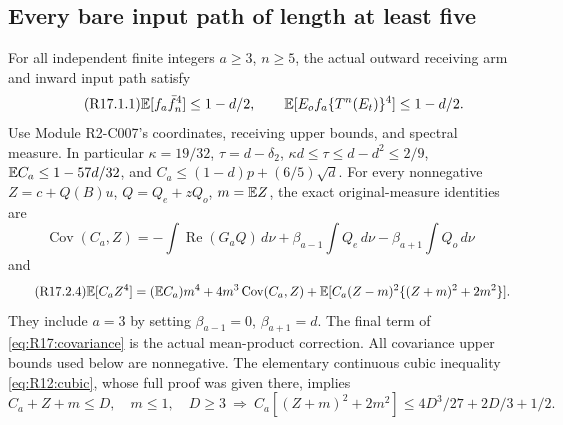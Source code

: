 \subsection{Every bare input path of length at least five}\label{proof:R2-C017}
For all independent finite integers $a\ge3$, $n\ge5$, the actual
outward receiving arm and inward input path satisfy
\begin{equation}\tag{R17.1.1}\label{eq:R17:claim}
\mathbb E[f_a\bar f_n^4]\le1-d/2,\qquad
\mathbb E[E_of_a\{T^n(E_t)\}^4]\le1-d/2.
\end{equation}
Use Module R2-C007's coordinates, receiving upper bounds, and spectral
measure. In particular $\kappa=19/32$, $\tau=d-\delta_2$,
$\kappa d\le\tau\le d-d^2\le2/9$,
$\mathbb E C_a\le1-57d/32$, and
$C_a\le(1-d)p+(6/5)\sqrt d$.
For every nonnegative $Z=c+Q(B)u$, $Q=Q_e+zQ_o$, $m=\mathbb E Z$,
the exact original-measure identities are
\begin{equation}\tag{R17.2.3}\label{eq:R17:covariance}
\operatorname{Cov}(C_a,Z)
=-\int\operatorname{Re}(G_aQ)\,d\nu
+\beta_{a-1}\int Q_e\,d\nu-\beta_{a+1}\int Q_o\,d\nu
\end{equation}
and
\begin{equation}\tag{R17.2.4}\label{eq:R17:taylor}
\mathbb E[C_aZ^4]=(\mathbb E C_a)m^4+4m^3\operatorname{Cov}(C_a,Z)
+\mathbb E[C_a(Z-m)^2\{(Z+m)^2+2m^2\}].
\end{equation}
They include $a=3$ by setting $\beta_{a-1}=0$, $\beta_{a+1}=d$.
The final term of \eqref{eq:R17:covariance} is the actual mean-product
correction. All covariance upper bounds used below are nonnegative.
The elementary continuous cubic inequality \eqref{eq:R12:cubic},
whose full proof was given there, implies
\begin{equation}\tag{R17.3.2}\label{eq:R17:cubic}
C_a+Z+m\le D,\quad m\le1,\quad D\ge3
\ \Longrightarrow\
C_a[(Z+m)^2+2m^2]\le4D^3/27+2D/3+1/2.
\end{equation}

